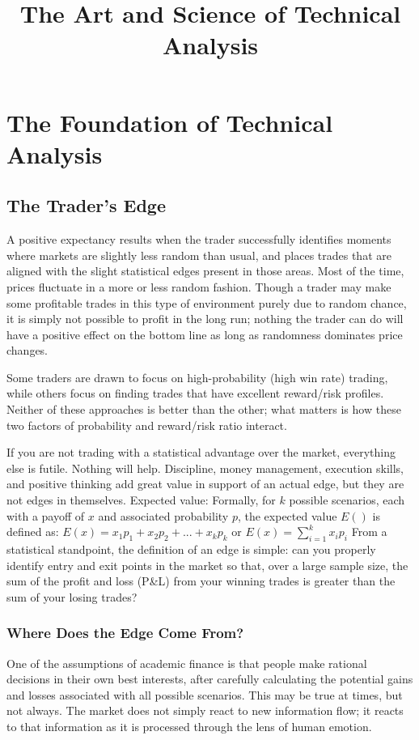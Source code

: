 \documentclass[10pt,twocolumn]{../notes}
\title{The Art and Science of Technical Analysis}
\begin{document}
\maketitle
\tableofcontents
\section{The Foundation of Technical Analysis}
\subsection{The Trader’s Edge}

\Advice A positive expectancy results when the trader successfully identifies moments where markets are slightly less random than usual, and places trades that are aligned with the slight statistical edges present in those areas.
\Fact Most of the time, prices fluctuate in a more or less random fashion.
\Quote Though a trader may make some profitable trades in this type of environment purely due to random chance, it is simply not possible to profit in the long run; nothing the trader can do will have a positive effect on the bottom line as long as randomness dominates price changes.

\Quote Some traders are drawn to focus on high-probability (high win rate) trading, while others focus on finding trades that have excellent reward/risk profiles. Neither of these approaches is better than the other; what matters is how these two factors of probability and reward/risk ratio interact.

\Advice If you are not trading with a statistical advantage over the market, everything else is futile. Nothing will help. Discipline, money management, execution skills, and positive thinking add great value in support of an actual edge, but they are not edges in themselves.
\Fact Expected value: Formally, for $k$ possible scenarios, each with a payoff of $x$ and associated probability $p$, the expected value $E()$ is defined as: $E(x) = x_1p_1+x_2p_2+...+x_kp_k$ or $E(x) = \sum_{i=1}^{k} x_ip_i$
\Quote From a statistical standpoint, the definition of an edge is simple: can you properly identify entry and exit points in the market so that, over a large sample size, the sum of the profit and loss (P\&L) from your winning trades is greater than the sum of your losing trades?

\subsubsection{Where Does the Edge Come From?}
\Quote One of the assumptions of academic finance is that people make rational decisions in their own best interests, after carefully calculating the potential gains and losses associated with all possible scenarios. This may be true at times, but not always.
\Quote The market does not simply react to new information flow; it reacts to that information as it is processed through the lens of human emotion.
\end{document}
